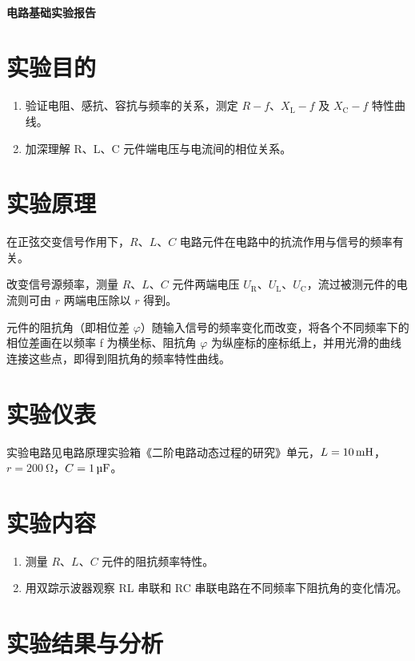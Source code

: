\documentclass[a4paper,utf8]{article}
\begin{document}
\begin{center}
    {\mbox{}\\[7em]\bfseries\songti%
    电路基础实验报告}\\[34mm]
\end{center}
\newpage

\section{实验目的}
\begin{enumerate}
    \item 验证电阻、感抗、容抗与频率的关系，测定 $R-f$、$X_\text{L}-f$ 及 $X_\text{C}-f$ 特性曲线。
    \item 加深理解 R、L、C 元件端电压与电流间的相位关系。
\end{enumerate}

\section{实验原理}%
在正弦交变信号作用下，$R$、$L$、$C$ 电路元件在电路中的抗流作用与信号的频率有关。\par
改变信号源频率，测量 $R$、$L$、$C$ 元件两端电压 $U_\text{R}$、$U_\text{L}$、$U_\text{C}$，流过被测元件的电流则可由 $r$ 两端电压除以 $r$ 得到。\par
元件的阻抗角（即相位差 $\varphi$）随输入信号的频率变化而改变，将各个不同频率下的相位差画在以频率 f 为横坐标、阻抗角 $\varphi$ 为纵座标的座标纸上，并用光滑的曲线连接这些点，即得到阻抗角的频率特性曲线。 

\section{实验仪表}
    实验电路见电路原理实验箱《二阶电路动态过程的研究》单元，$L=\SI{10}{\mH}$，$r=\SI{200}{\ohm}$，$C=\SI{1}{\uF}$。

\section{实验内容}
\begin{enumerate}
    \item 测量 $R$、$L$、$C$ 元件的阻抗频率特性。
    \item 用双踪示波器观察 RL 串联和 RC 串联电路在不同频率下阻抗角的变化情况。
\end{enumerate}
\section{实验结果与分析}
\end{document}
